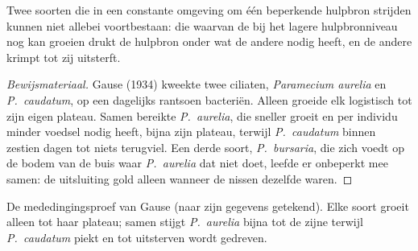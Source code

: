 \begin{proposition}\label{prop:b1:species-interactions:gause}
Twee soorten die in een constante omgeving om één beperkende hulpbron
strijden kunnen niet allebei voortbestaan: die waarvan de  bij het
lagere hulpbronniveau nog kan groeien drukt de hulpbron onder wat de andere
nodig heeft, en de andere krimpt tot zij uitsterft.
\end{proposition}
\begin{proof}[Bewijsmateriaal]
Gause (1934) kweekte twee ciliaten, \emph{Paramecium aurelia} en
\emph{P.~caudatum}, op een dagelijks rantsoen bacteriën. Alleen groeide elk
logistisch tot zijn eigen plateau. Samen bereikte \emph{P.~aurelia}, die
sneller groeit en per individu minder voedsel nodig heeft, bijna zijn
plateau, terwijl \emph{P.~caudatum} binnen zestien dagen tot niets
terugviel. Een derde soort, \emph{P.~bursaria}, die zich voedt op de bodem
van de buis waar \emph{P.~aurelia} dat niet doet, leefde er onbeperkt mee
samen: de uitsluiting gold alleen wanneer de nissen dezelfde waren.
\end{proof}

\begin{omfigure}

{\small De mededingingsproef van Gause (naar zijn gegevens getekend). Elke
soort groeit alleen tot haar plateau; samen stijgt \emph{P.~aurelia} bijna
tot de zijne terwijl \emph{P.~caudatum} piekt en tot uitsterven wordt
gedreven.}
\end{omfigure}

